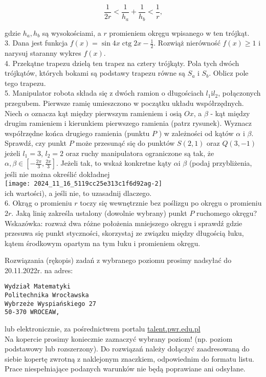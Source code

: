 \documentclass[10pt]{article}
\begin{document}
$$
\frac{1}{2 r}<\frac{1}{h_{a}}+\frac{1}{h_{b}}<\frac{1}{r},
$$

gdzie $h_{a}, h_{b}$ są wysokościami, a $r$ promieniem okręgu wpisanego w ten trójkąt.\\
3. Dana jest funkcja $f(x)=\sin 4 x \operatorname{ctg} 2 x-\frac{1}{2}$. Rozwiąż nierówność $f(x) \geqslant 1$ i narysuj staranny wykres $f(x)$.\\
4. Przekątne trapezu dzielą ten trapez na cztery trójkąty. Pola tych dwóch trójkątów, których bokami są podstawy trapezu równe są $S_{a}$ i $S_{b}$. Oblicz pole tego trapezu.\\
5. Manipulator robota składa się z dwóch ramion o długościach $l_{1} \mathrm{i} l_{2}$, połączonych przegubem. Pierwsze ramię umieszczono w początku układu współrzędnych.\\
Niech $\alpha$ oznacza kąt między pierwszym ramieniem i osią $O x$, a $\beta$ - kąt między drugim ramieniem i kierunkiem pierwszego ramienia (patrz rysunek). Wyznacz współrzędne końca drugiego ramienia (punktu $P$ ) w zależności od kątów $\alpha$ i $\beta$. Sprawdź, czy punkt $P$ może przesunąć się do punktów $S(2,1)$ oraz $Q(3,-1)$ jeżeli $l_{1}=3$, $l_{2}=2$ oraz ruchy manipulatora ograniczone są tak, że $\alpha, \beta \in\left[-\frac{2 \pi}{3}, \frac{2 \pi}{3}\right]$. Jeżeli tak, to wskaż konkretne kąty $\alpha \mathrm{i}$ $\beta$ (podaj przybliżenia, jeśli nie można określić dokładnej\\
\texttt{[image: 2024\_11\_16\_5119cc25e313c1f6d92ag-2]}\\
ich wartości), a jeśli nie, to uzasadnij dlaczego.\\
6. Okrąg o promieniu $r$ toczy się wewnętrznie bez poślizgu po okręgu o promieniu $2 r$. Jaką linię zakreśla ustalony (dowolnie wybrany) punkt $P$ ruchomego okręgu? Wskazówka: rozważ dwa różne położenia mniejszego okręgu i sprawdź gdzie przesuwa się punkt styczności, skorzystaj ze związku między długością łuku, kątem środkowym opartym na tym łuku i promieniem okręgu.

Rozwiązania (rękopis) zadań z wybranego poziomu prosimy nadsyłać do 20.11.2022r. na adres:

\begin{verbatim}
Wydział Matematyki
Politechnika Wrocławska
Wybrzeże Wyspiańskiego 27
50-370 WROCEAW,
\end{verbatim}

lub elektronicznie, za pośrednictwem portalu \href{http://talent.pwr.edu.pl}{talent.pwr.edu.pl}\\
Na kopercie prosimy koniecznie zaznaczyć wybrany poziom! (np. poziom podstawowy lub rozszerzony). Do rozwiązań należy dołączyć zaadresowaną do siebie kopertę zwrotną z naklejonym znaczkiem, odpowiednim do formatu listu. Prace niespełniające podanych warunków nie będą poprawiane ani odsyłane.
\end{document}
